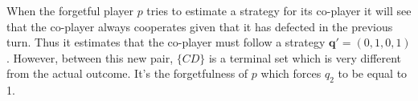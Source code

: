 \documentclass{article}
\theoremstyle{definition}
\begin{document}
When the forgetful player \(p\) tries to estimate a strategy for its co-player
it will see that the co-player always cooperates given that it has defected in
the previous turn. Thus it estimates that the co-player must follow a strategy
\(\mathbf{q'} = (0, 1, 0, 1)\). However, between this new pair, \(\{CD\}\) is a
terminal set which is very different from the actual outcome. It's the
forgetfulness of \(p\) which forces \(q_2\) to be equal to 1.


\end{document}
